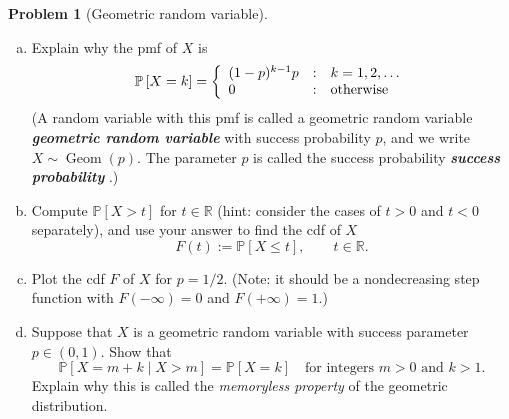 \documentclass[10pt]{article}
\theoremstyle{definition}
\newtheorem{problem}[theorem]{Problem}
\newcommand{\1}[1]{\textbf{1}_{\left[#1\right]}} %
\def\R{\mathbb{R}} %
\def\P{\mathbb{P}} %
\DeclareRobustCommand{\demph}[1]{%
  \ifmmode
  {\color{Blue}#1}%
  \else
  {\color{Blue}\bfseries\slshape #1}%
  \fi
}
\begin{document}
\begin{problem}[Geometric random variable]
  \begin{enumerate}[(a)]
    \item Explain why the pmf of $X$ is
    \begin{equation*}
      \P\left[X=k \right] = \left\{ \begin{array}{l@{\quad:\quad}l} (1-p)^{k-1}p & k=1,2,\ldots\\0 &\text{otherwise} \end{array}\right.
    \end{equation*}
    (A random variable with this pmf is called a \demph{geometric random
      variable} with success probability $p$, and we write
    $X\sim \operatorname{Geom}(p)$. The parameter $p$ is called the
    \demph{success probability}.)
    \item Compute $\P\left[X>t \right]$ for $t\in \R$ (hint: consider the
    cases of $t>0$ and $t<0$ separately), and use your answer to find the cdf
    of $X$
    \begin{equation*}
      F(t) := \P \left[ X \leq t\right], \qquad t\in \R. 
    \end{equation*}
    \item Plot the cdf $F$ of $X$ for $p=1/2$. (Note: it should be a
    nondecreasing step function with $F(-\infty)=0$ and $F(+\infty)=1$.)
    \item Suppose that $X$ is a geometric random
    variable with success parameter $p\in (0,1)$. Show that 
    \begin{equation*}
      \P\left[X=m+k \mid X>m\right] = \P\left[X=k \right] \quad \text{for
        integers $m>0$ and $k>1$.}
    \end{equation*}
    Explain why this is called the \textit{memoryless property} of the geometric distribution.
  \end{enumerate}
\end{problem}
\end{document}

